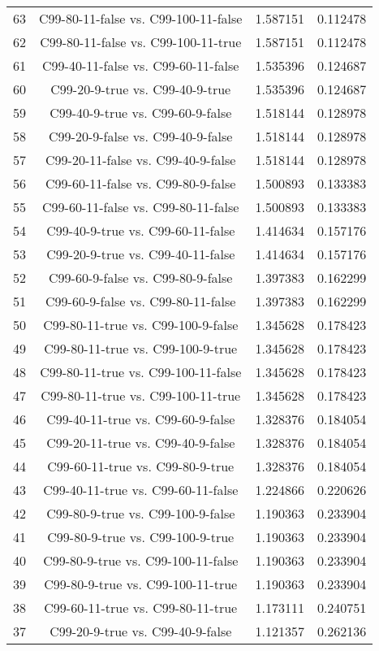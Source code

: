 \documentclass[a4paper,10pt]{article}
\begin{document}
\begin{landscape}
\begin{table}[!htp]
\begin{tabular}{cccc}
63&C99-80-11-false vs. C99-100-11-false&1.587151&0.112478\\
62&C99-80-11-false vs. C99-100-11-true&1.587151&0.112478\\
61&C99-40-11-false vs. C99-60-11-false&1.535396&0.124687\\
60&C99-20-9-true vs. C99-40-9-true&1.535396&0.124687\\
59&C99-40-9-true vs. C99-60-9-false&1.518144&0.128978\\
58&C99-20-9-false vs. C99-40-9-false&1.518144&0.128978\\
57&C99-20-11-false vs. C99-40-9-false&1.518144&0.128978\\
56&C99-60-11-false vs. C99-80-9-false&1.500893&0.133383\\
55&C99-60-11-false vs. C99-80-11-false&1.500893&0.133383\\
54&C99-40-9-true vs. C99-60-11-false&1.414634&0.157176\\
53&C99-20-9-true vs. C99-40-11-false&1.414634&0.157176\\
52&C99-60-9-false vs. C99-80-9-false&1.397383&0.162299\\
51&C99-60-9-false vs. C99-80-11-false&1.397383&0.162299\\
50&C99-80-11-true vs. C99-100-9-false&1.345628&0.178423\\
49&C99-80-11-true vs. C99-100-9-true&1.345628&0.178423\\
48&C99-80-11-true vs. C99-100-11-false&1.345628&0.178423\\
47&C99-80-11-true vs. C99-100-11-true&1.345628&0.178423\\
46&C99-40-11-true vs. C99-60-9-false&1.328376&0.184054\\
45&C99-20-11-true vs. C99-40-9-false&1.328376&0.184054\\
44&C99-60-11-true vs. C99-80-9-true&1.328376&0.184054\\
43&C99-40-11-true vs. C99-60-11-false&1.224866&0.220626\\
42&C99-80-9-true vs. C99-100-9-false&1.190363&0.233904\\
41&C99-80-9-true vs. C99-100-9-true&1.190363&0.233904\\
40&C99-80-9-true vs. C99-100-11-false&1.190363&0.233904\\
39&C99-80-9-true vs. C99-100-11-true&1.190363&0.233904\\
38&C99-60-11-true vs. C99-80-11-true&1.173111&0.240751\\
37&C99-20-9-true vs. C99-40-9-false&1.121357&0.262136\\

\end{tabular}
\end{table}
\end{landscape}
\end{document}
